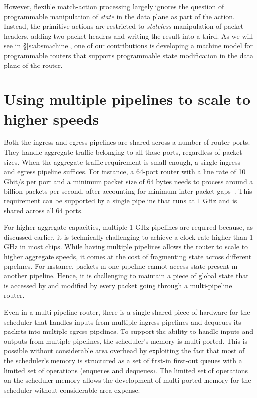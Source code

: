 However, flexible match-action processing largely ignores the question of
programmable manipulation of {\em state} in the data plane as part of the
action.  Instead, the primitive actions are restricted to {\em stateless}
manipulation of packet headers, \eg adding two packet headers and writing the
result into a third. As we will see in \S\ref{s:absmachine}, one of our
contributions is developing a machine model for programmable routers that
supports programmable state modification in the data plane of the router. 

\section{Using multiple pipelines to scale to higher speeds}
Both the ingress and egress pipelines are shared across a number of router
ports.  They handle aggregate traffic belonging to all these ports, regardless
of packet sizes. When the aggregate traffic requirement is small enough, a
single ingress and egress pipeline suffices. For instance, a 64-port router
with a line rate of 10 Gbit/s per port and a minimum packet size of 64 bytes
needs to process around a billion packets per second, after accounting for
minimum inter-packet gaps~\cite{rmt}.  This requirement can be supported by a
single pipeline that runs at 1 GHz and is shared across all 64 ports.

For higher aggregate capacities, multiple 1-GHz pipelines are required because,
 as discussed earlier, it is technically challenging to achieve a clock rate
higher than 1 GHz in most chips. While having multiple pipelines allows the
router to scale to higher aggregate speeds, it comes at the cost of fragmenting
state across different pipelines.  For instance, packets in one pipeline cannot
access state present in another pipeline. Hence, it is challenging to maintain a
piece of global state that is accessed by and modified by every packet going
through a multi-pipeline router.

Even in a multi-pipeline router, there is a single shared piece of hardware for
the scheduler that handles inputs from multiple ingress pipelines and dequeues
its packets into multiple egress pipelines. To support the ability to handle
inputs and outputs from multiple pipelines, the scheduler's memory is
multi-ported.  This is possible without considerable area overhead by
exploiting the fact that most of the scheduler's memory is structured as a set
of first-in first-out queues with a limited set of operations (\eg enqueues and
dequeues). The limited set of operations on the scheduler memory allows the
development of multi-ported memory for the scheduler without considerable area
expense.

